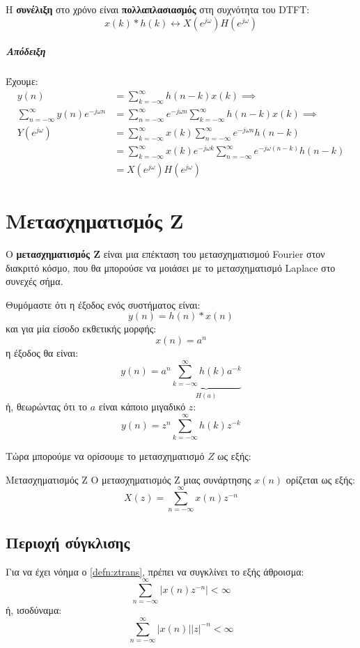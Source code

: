 \documentclass[11pt,a4paper,notitlepage,fleqn,draft]{article}
\begin{document}
\begin{theorem}{}{}
	Η \textbf{συνέλιξη} στο χρόνο είναι \textbf{πολλαπλασιασμός} στη συχνότητα του DTFT:
	\[
	x(k) * h(k) \leftrightarrow X\left(e^{j\omega }\right) H\left(e^{j\omega }\right)
	\]
\end{theorem}

\subparagraph{Απόδειξη}
Έχουμε:
\begin{align*}
	y(n) &= \sum_{k=-\infty}^{\infty}
	h(n-k)x(k)
	\implies \\
	\sum_{n=-\infty}^{\infty}y(n)e^{-j\omega n} &= \sum_{n=-\infty}^{\infty}
	e^{-j\omega n}\sum_{k=-\infty}^{\infty} h(n-k)x(k)
	\implies \\
	Y\left(e^{j\omega }\right) &= \sum_{k=-\infty}^{\infty} x(k) \sum_{n=-\infty}^{\infty}e^{-j\omega n}h(n-k)
    \\ &=
    \sum_{k=-\infty}^{\infty}x(k)e^{-j\omega k}\sum_{n=-\infty}^{\infty}e^{-j\omega (n-k)}h(n-k)
    \\ &= X\left(e^{j\omega }\right) H\left(e^{j\omega }\right)
\end{align*}

\section{Μετασχηματισμός Z}
Ο \textbf{μετασχηματισμός Z} είναι μια επέκταση του μετασχηματισμού Fourier στον διακριτό κόσμο, που
θα μπορούσε να μοιάσει με το μετασχηματισμό Laplace στο συνεχές σήμα.

Θυμόμαστε ότι η έξοδος ενός συστήματος είναι:
\[
y(n) = h(n) * x(n)
\]
και για μία είσοδο εκθετικής μορφής:
\[
x(n) =a^n
\]
η έξοδος θα είναι:
\[
y(n) = a^n \underbrace{\sum_{k=-\infty}^{\infty} h(k)a^{-k}}_{H(a)}
\]
ή, θεωρώντας ότι το \( a \) είναι κάποιο μιγαδικό \( z \):
\[
y(n) = z^n \sum_{k=-\infty}^{\infty} h(k)z^{-k}
\]

Τώρα μπορούμε να ορίσουμε το μετασχηματισμό \( Z \) ως εξής:
\begin{defn}[label=defn:ztrans]{Μετασχηματισμός Z}{}
	Ο μετασχηματισμός Z μιας συνάρτησης \( x(n) \) ορίζεται ως εξής:
	\[
	X(z) = \sum_{n=-\infty}^{\infty} x(n) z^{-n}
	\]
\end{defn}

\subsection{Περιοχή σύγκλισης}

Για να έχει νόημα ο \autoref{defn:ztrans}, πρέπει να συγκλίνει το εξής άθροισμα:
\[
\sum_{n=-\infty}^{\infty} \left| x(n)z^{-n} \right| < \infty
\]
ή, ισοδύναμα:
\[
\sum_{n=-\infty}^{\infty} \left\lvert x(n) \right\rvert \left\lvert z\right\rvert^{-n} < \infty
\]
\end{document}
